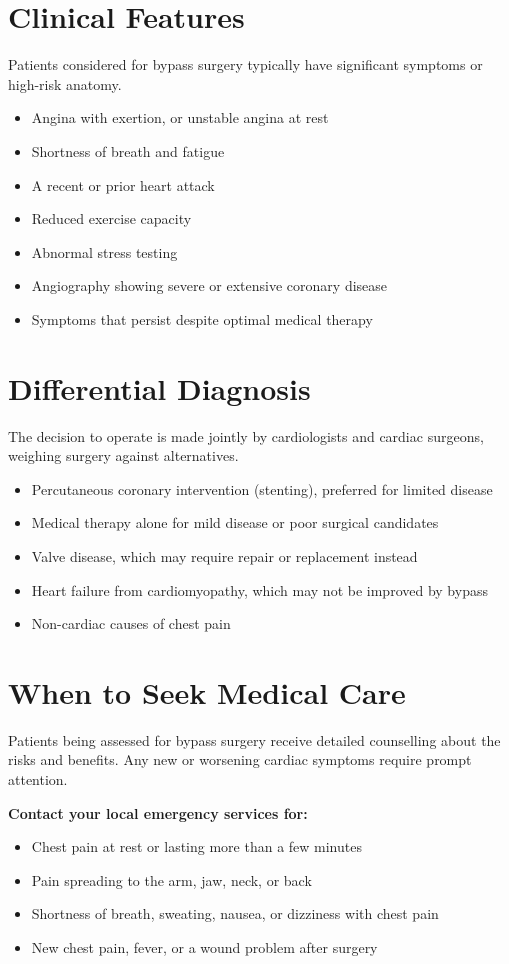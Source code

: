 \section*{Clinical Features}
Patients considered for bypass surgery typically have significant symptoms or high-risk anatomy.

\begin{itemize}
    \item Angina with exertion, or unstable angina at rest
    \item Shortness of breath and fatigue
    \item A recent or prior heart attack
    \item Reduced exercise capacity
    \item Abnormal stress testing
    \item Angiography showing severe or extensive coronary disease
    \item Symptoms that persist despite optimal medical therapy
\end{itemize}

\section*{Differential Diagnosis}
The decision to operate is made jointly by cardiologists and cardiac surgeons, weighing surgery against alternatives.

\begin{itemize}
    \item Percutaneous coronary intervention (stenting), preferred for limited disease
    \item Medical therapy alone for mild disease or poor surgical candidates
    \item Valve disease, which may require repair or replacement instead
    \item Heart failure from cardiomyopathy, which may not be improved by bypass
    \item Non-cardiac causes of chest pain
\end{itemize}

\section*{When to Seek Medical Care}
Patients being assessed for bypass surgery receive detailed counselling about the risks and benefits. Any new or worsening cardiac symptoms require prompt attention.

\textbf{Contact your local emergency services for:}
\begin{itemize}
    \item Chest pain at rest or lasting more than a few minutes
    \item Pain spreading to the arm, jaw, neck, or back
    \item Shortness of breath, sweating, nausea, or dizziness with chest pain
    \item New chest pain, fever, or a wound problem after surgery
\end{itemize}

